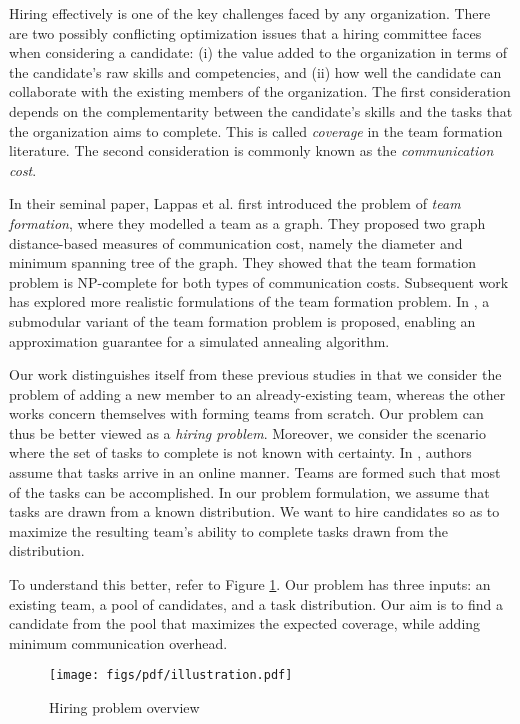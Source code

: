 Hiring effectively is one of the key challenges faced by any organization.
There are two possibly conflicting optimization issues that a hiring committee faces when considering a candidate: 
(i) the value added to the organization in terms of the candidate's raw skills and competencies, and 
(ii) how well the candidate can collaborate with the existing members of the organization.
The first consideration depends on the complementarity between the candidate's skills and the tasks that the organization aims to complete. 
This is called \textit{coverage} in the team formation literature.
The second consideration is commonly known as the \textit{communication cost}.

In their seminal paper, Lappas et al. \cite{lappas2009finding} first introduced the problem of \textit{team formation}, where they modelled a team as a graph.
They proposed two graph distance-based measures of communication cost, namely the diameter and minimum spanning tree of the graph. 
They showed that the team formation problem is NP-complete for both types of communication costs. 
Subsequent work  \cite{sozio2010community, kargar2011discovering, anagnostopoulos2010power, rangapuram2013towards} has explored more realistic formulations of the team  formation problem.
In \cite{bhowmik2014submodularity}, a submodular variant of the team formation problem is proposed, enabling an approximation guarantee for a simulated annealing algorithm.

Our work distinguishes itself from these previous studies in that we consider the problem of adding a new member to an already-existing team, whereas the other works concern themselves with forming teams from scratch.
Our problem can thus be better viewed as a \textit{hiring problem}. Moreover, we consider the scenario where the set of tasks to complete is not known with certainty.
In \cite{anagnostopoulos2012online}, authors assume that tasks arrive in an online manner.
Teams are formed such that most of the tasks can be accomplished.
In our problem formulation, we assume that tasks are drawn from a known distribution.
We want to hire candidates so as to maximize the resulting team's ability to complete tasks drawn from the distribution.

To understand this better, refer to Figure \ref{fig:hpo}.
Our problem has three inputs: an existing team, a pool of candidates, and a task distribution. 
Our aim is to find a candidate from the pool that maximizes the expected coverage, while adding minimum communication overhead. 
\begin{figure}
\centering
\begin{small}
\texttt{[image: figs/pdf/illustration.pdf]}
\caption{Hiring problem overview}
\label{fig:hpo}
\end{small}
\end{figure} 

